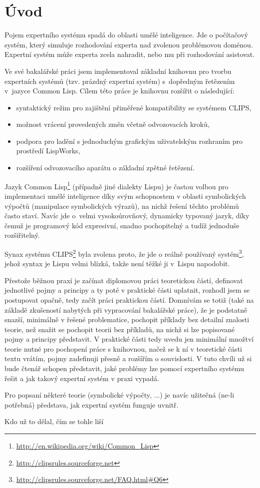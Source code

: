 \section{Úvod}

Pojem expertního systému spadá do oblasti umělé inteligence. Jde o počítačový
systém, který simuluje rozhodování experta nad zvolenou problémovou doménou.
Expertní systém může experta zcela nahradit, nebo mu při rozhodování asistovat.

Ve své bakalářské práci \cite{bakalarka} jsem implementoval základní knihovnu pro tvorbu
expertních systémů (tzv. prázdný expertní systém) s~dopředným řetězením v~jazyce
Common Lisp. Cílem této práce je knihovnu rozšířit o následující:
\begin{itemize}
  \item syntaktický režim pro zajištění přiměřené kompatibility se systémem
    CLIPS,
  \item možnost vrácení provedených změn včetně odvozovacích kroků,
  \item podpora pro ladění s jednoduchým grafickým uživatelským rozhraním pro
    prostředí LispWorks\texttrademark,
  \item rozšíření odvozovacího aparátu o základní zpětné řetězení.
\end{itemize}

Jazyk Common Lisp\footnote{\url{http://en.wikipedia.org/wiki/Common\_Lisp}}
(případně jiné dialekty Lispu) je častou volbou pro implementaci umělé
inteligence díky svým schopnostem v oblasti symbolických výpočtů (manipulace
symbolických výrazů), na nichž řešení těchto problémů často staví. Navíc jde
o~velmi vysokoúrovňový, dynamicky typovaný jazyk, díky čemuž je programový kód
expresivní, snadno pochopitelný a tudíž jednoduše rozšiřitelný.

Synax systému CLIPS\footnote{\url{http://clipsrules.sourceforge.net}} byla
zvolena proto, že jde o reálně používaný
systém\footnote{\url{http://clipsrules.sourceforge.net/FAQ.html\#Q6}}, jehož
syntax je Lispu velmi blízká, takže není těžké ji v~Lispu napodobit.

Přestože běžnou praxí je začínat diplomovou práci teoretickou částí, definovat
jednotlivé pojmy a principy a ty poté v praktické části uplatnit, rozhodl jsem
se postupovat opačně, tedy začít práci praktickou částí. Domnívám se totiž (také
na základě zkušeností nabytých při vypracování bakalářské práce), že je podstatně
snazší, minimálně v řešené problematice, pochopit příklady bez detailní znalosti
teorie, než snažit se pochopit teorii bez příkladů, na nichž si lze popisované
pojmy a principy představit. V praktické části tedy uvedu jen minimální množtví
teorie nutné pro pochopení práce s knihovnou, načež se k ní v teoretické části
textu vrátím, pojmy zadefinuji přesně a rozšířím o souvislosti. V tuto chvíli už
si bude čtenář schopen představit, jaké problémy lze pomocí expertního systému
řešit a jak takový expertní systém v praxi vypadá.

\begin{framed}
  Pro popsaní některé teorie (symbolické výpočty, ...) je navíc užitečná (ne-li
  potřebná) představa, jak expertní systém funguje uvnitř.
\end{framed}

\begin{framed}
  Kdo už to dělal, čím se tohle liší
\end{framed}
